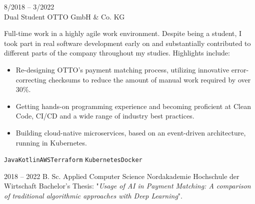 \documentclass[9pt]{developercv} %
\begin{document}
\begin{entrylist}
{    }
	\entry
		{8/2018 -- 3/2022\\}
		{Dual Student}
		{OTTO GmbH \& Co. KG}
		{Full-time work in a highly agile work environment. Despite being a student, I took part in real software development early on and substantially contributed to different parts of the company throughout my studies. Highlights include:
        \begin{itemize}
            \item Re-designing OTTO's payment matching process, utilizing innovative error-correcting checksums to reduce the amount of manual work required by over 30\%.
            \item Getting hands-on programming experience and becoming proficient at Clean Code, CI/CD and a wide range of industry best practices.
            \item Building cloud-native microservices, based on an event-driven architecture, running in Kubernetes.
        \end{itemize}
        \texttt{Java}\slashsep\texttt{Kotlin}\slashsep\texttt{AWS}\slashsep\texttt{Terraform}
        \texttt{Kubernetes}\slashsep\texttt{Docker}
        }
\end{entrylist}

%

\pagebreak
{}

\begin{entrylist}
	\entry
		{2018 -- 2022}
		{B. Sc. Applied Computer Science}
		{Nordakademie Hochschule der Wirtschaft}
		{Bachelor's Thesis: "\textit{Usage of AI in Payment Matching: A comparison of traditional algorithmic approaches with Deep Learning}".}
\end{entrylist}



\end{document}
